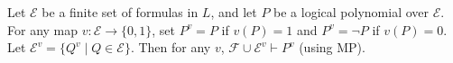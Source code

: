 Let $\mathcal{E}$ be a finite set of formulas in $L$, and let $P$ be a logical polynomial over $\mathcal{E}$. For any map $v: \mathcal{E} \to \{0,1\}$, set $P^v = P$ if $v(P) = 1$ and $P^v = \neg P$ if $v(P) = 0$. Let $\mathcal{E}^v = \{Q^v \mid Q \in \mathcal{E}\}$. Then for any $v$, $\mathcal{F} \cup \mathcal{E}^v \vdash P^v$ (using MP).
